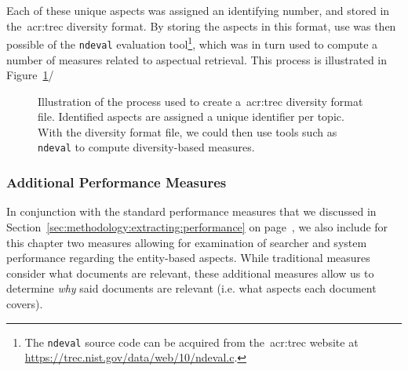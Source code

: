 Each of these unique aspects was assigned an identifying number, and stored in the~\gls{acr:trec} diversity format. By storing the aspects in this format, use was then possible of the \texttt{ndeval} evaluation tool\footnote{The \texttt{ndeval} source code can be acquired from the~\gls{acr:trec} website at \url{https://trec.nist.gov/data/web/10/ndeval.c}. }, which was in turn used to compute a number of measures related to aspectual retrieval. This process is illustrated in Figure~\ref{fig:entity_ids}/

\begin{figure}[t!]
    \centering
    \caption[Entity-based aspects example]{Illustration of the process used to create a~\gls{acr:trec} diversity format file. Identified aspects are assigned a unique identifier per topic. With the diversity format file, we could then use tools such as \texttt{ndeval} to compute diversity-based measures.}
    \label{fig:entity_ids}
\end{figure}

\subsubsection{Additional Performance Measures}\label{sec:diversity:users:measures}
In conjunction with the standard performance measures that we discussed in Section~\ref{sec:methodology:extracting:performance} on page~\pageref{sec:methodology:extracting:performance}, we also include for this chapter two measures allowing for examination of searcher and system performance regarding the entity-based aspects. While traditional measures consider what documents are relevant, these additional measures allow us to determine \emph{why} said documents are relevant (i.e. what aspects each document covers).

